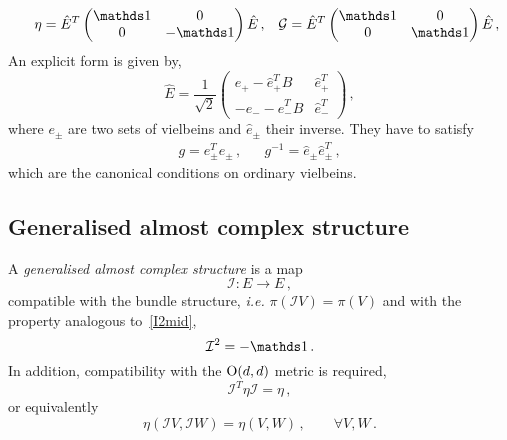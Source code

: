 \documentclass[debug]{phd}
\begin{document}
								\begin{align}
									& & \eta = \hat{E}^{T} \begin{pmatrix}
										\id & 0 \\
										0 & -\id
									\end{pmatrix} \hat{E} \, , & & \mathcal{G} = \hat{E}^{T} \begin{pmatrix}
										\id & 0 \\
										0 & \id
									\end{pmatrix} \hat{E} \, ,
								\end{align}
						An explicit form is given by,
								\begin{equation}
									\hat{E} = \frac{1}{\sqrt{2}} \begin{pmatrix}
									e_+ - \hat{e}_+^T B & \hat{e}_+^T \\
									- e_{-} - \hat{e}_{-}^T B & \hat{e}_{-}^T 
									\end{pmatrix}\, ,
								\end{equation}
						where $e_{\pm}$ are two sets of vielbeins and $\hat{e}_\pm$ their inverse.
						They have to satisfy
								\begin{align}
									&& g = e_{\pm}^T e_{\pm}\, , && g^{-1} = \hat{e}_{\pm} \hat{e}_{\pm}^T \, , & &
								\end{align}
						which are the canonical conditions on ordinary vielbeins.
				\subsection{Generalised almost complex structure}
						A \emph{generalised almost complex structure} is a map
								\begin{equation}
									\mathcal{I} : E \longrightarrow E \, ,
								\end{equation}
						compatible with the bundle structure, \emph{i.e.} $\pi( \mathcal{I} V) = \pi(V)$ and with the property analogous to~\eqref{I2mid},
								\begin{equation}
									\mathcal{I}^2 = - \id \, .
								\end{equation}
						In addition, compatibility with the $\mathrm{O}(d,d)$ metric is required,
								\begin{equation}\label{hermeta}
									\mathcal{I}^T \eta \mathcal{I} = \eta \, ,
								\end{equation}
						or equivalently
								\begin{equation}\label{hermeta2}
									\eta(\mathcal{I} V, \mathcal{I} W) = \eta (V, W) \, , \qquad \forall V, W \, .
								\end{equation}
						
\end{document}
